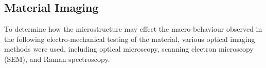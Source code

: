 \subsection{Material Imaging}
To determine how the microstructure may effect the macro-behaviour observed in the following electro-mechanical testing of the material, various optical imaging methods were used, including optical microscopy, scanning electron microscopy (SEM), and Raman spectroscopy. 

